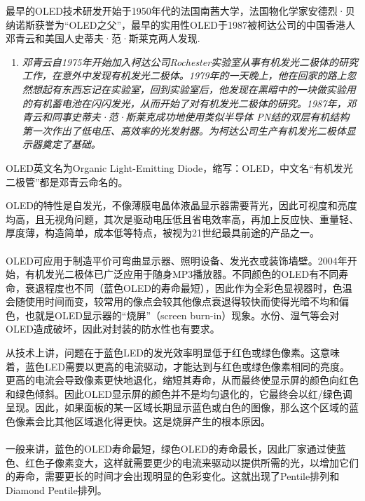 \begin{slide}
最早的OLED技术研发开始于1950年代的法国南茜大学，法国物化学家安德烈·贝纳诺斯获誉为“OLED之父”，最早的实用性OLED于1987被柯达公司的中国香港人邓青云和美国人史蒂夫·范·斯莱克两人发现.
\begin{enumerate}[]
    \item \textit{邓青云自1975年开始加入柯达公司Rochester实验室从事有机发光二极体的研究工作，在意外中发现有机发光二极体。1979年的一天晚上，他在回家的路上忽然想起有东西忘记在实验室，回到实验室后，他发现在黑暗中的一块做实验用的有机蓄电池在闪闪发光，从而开始了对有机发光二极体的研究。1987年，邓青云和同事史蒂夫·范·斯莱克成功地使用类似半导体 PN结的双层有机结构第一次作出了低电压、高效率的光发射器。为柯达公司生产有机发光二极体显示器奠定了基础。}
\end{enumerate}

OLED英文名为Organic Light-Emitting Diode，缩写：OLED，中文名“有机发光二极管”都是邓青云命名的。
\end{slide}

\begin{slide}
OLED的特性是自发光，不像薄膜电晶体液晶显示器需要背光，因此可视度和亮度均高，且无视角问题，其次是驱动电压低且省电效率高，再加上反应快、重量轻、厚度薄，构造简单，成本低等特点，被视为21世纪最具前途的产品之一。
\\~\\
OLED可应用于制造平价可弯曲显示器、照明设备、发光衣或装饰墙壁。2004年开始，有机发光二极体已广泛应用于随身MP3播放器。不同颜色的OLED有不同寿命，衰退程度也不同（蓝色OLED的寿命最短），因此作为全彩色显视器时，色温会随使用时间而变，较常用的像点会较其他像点衰退得较快而使得光暗不均和偏色，也就是OLED显示器的“烧屏”（screen burn-in）现象。水份、湿气等会对OLED造成破坏，因此对封装的防水性也有要求。
\end{slide}

\begin{slide}
从技术上讲，问题在于蓝色LED的发光效率明显低于红色或绿色像素。这意味着，蓝色LED需要以更高的电流驱动，才能达到与红色或绿色像素相同的亮度。更高的电流会导致像素更快地退化，缩短其寿命，从而最终使显示屏的颜色向红色和绿色倾斜。因此OLED显示屏的颜色并不是均匀退化的，它最终会以红/绿色调呈现。因此，如果面板的某一区域长期显示蓝色或白色的图像，那么这个区域的蓝色像素会比其他区域退化得更快。这是烧屏产生的根本原因。
\\~\\
一般来讲，蓝色的OLED寿命最短，绿色OLED的寿命最长，因此厂家通过使蓝色、红色子像素变大，这样就需要更少的电流来驱动以提供所需的光，以增加它们的寿命，需要更长的时间才会出现明显的色彩变化。这就出现了Pentile排列和Diamond Pentile排列。
\end{slide}

